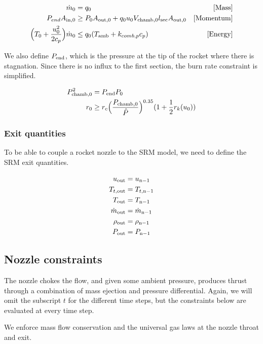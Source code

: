 \begin{align}
    \dot{m}_0 &= q_0 &\mathrm{[Mass]} \\
    P_{end} A_{\rm{in}, 0} &\geq P_0 A_{\rm{out}, 0} + q_0 u_0 V_{\rm{chamb},0} l_{\rm{sec}} A_{\rm{out},0} &\mathrm{[Momentum]} \\
    \Big(T_{0} + \frac{u_0^2}{2c_p}\Big) \dot{m}_0 &\leq q_0 (T_{\rm{amb}} + k_{comb,p} c_{p}) &\mathrm{[Energy]}
\end{align}

We also define $P_{\rm{end}}$, which is the pressure at the tip of the rocket where there is stagnation.
Since there is no influx to the first section, the burn rate constraint is simplified.

\begin{align}
    P_{\rm{chamb}, 0}^2 &= P_{\rm{end}} P_0 \\
    r_{0} &\geq r_c  \Big(\frac{P_{\rm{chamb},0}}{\hat{P}}\Big)^{0.35} (1 + \frac{1}{2} r_k (u_{0}))
\end{align}

\subsubsection{Exit quantities}

To be able to couple a rocket nozzle to the SRM model,
we need to define the SRM exit quantities.

\begin{align}
    u_{\rm{out}} &= u_{\rm{n}-1} \\
    T_{t,\rm{out}} &= T_{t,\rm{n}-1} \\
    T_{\rm{out}} &= T_{\rm{n}-1} \\
    \dot{m}_{\rm{out}} &= \dot{m}_{\rm{n}-1} \\
    \rho_{\rm{out}} &= \rho_{\rm{n}-1} \\
    P_{\rm{out}} &= P_{\rm{n}-1}
\end{align}

\subsection{Nozzle constraints}

The nozzle chokes the flow, and given some ambient pressure,
produces thrust through a combination of mass ejection and
pressure differential. Again, we will omit the subscript $t$ for
the different time steps, but the constraints below are evaluated
at every time step.

We enforce mass flow conservation and the universal gas laws
at the nozzle throat and exit.


